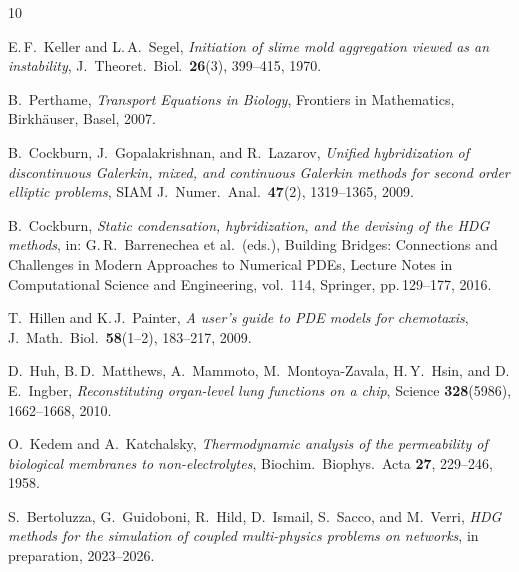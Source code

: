 \documentclass[11pt,a4paper]{article}
\begin{document}
\begingroup
\raggedright
\begin{thebibliography}{10}

E.\,F.~Keller and L.\,A.~Segel,
\emph{Initiation of slime mold aggregation viewed as an instability},
J.~Theoret.\ Biol.\ \textbf{26}(3), 399--415, 1970.

B.~Perthame,
\emph{Transport Equations in Biology},
Frontiers in Mathematics, Birkh\"auser, Basel, 2007.

B.~Cockburn, J.~Gopalakrishnan, and R.~Lazarov,
\emph{Unified hybridization of discontinuous Galerkin, mixed, and
continuous Galerkin methods for second order elliptic problems},
SIAM J.~Numer.\ Anal.\ \textbf{47}(2), 1319--1365, 2009.

B.~Cockburn,
\emph{Static condensation, hybridization, and the devising of the
HDG methods},
in: G.\,R.~Barrenechea et al.\ (eds.), Building Bridges:
Connections and Challenges in Modern Approaches to Numerical
PDEs, Lecture Notes in Computational Science and Engineering,
vol.~114, Springer, pp.\,129--177, 2016.

T.~Hillen and K.\,J.~Painter,
\emph{A user's guide to PDE models for chemotaxis},
J.~Math.\ Biol.\ \textbf{58}(1--2), 183--217, 2009.

D.~Huh, B.\,D.~Matthews, A.~Mammoto, M.~Montoya-Zavala,
H.\,Y.~Hsin, and D.\,E.~Ingber,
\emph{Reconstituting organ-level lung functions on a chip},
Science \textbf{328}(5986), 1662--1668, 2010.

O.~Kedem and A.~Katchalsky,
\emph{Thermodynamic analysis of the permeability of biological
membranes to non-electrolytes},
Biochim.\ Biophys.\ Acta \textbf{27}, 229--246, 1958.

S.~Bertoluzza, G.~Guidoboni, R.~Hild, D.~Ismail, S.~Sacco, and M.~Verri,
\emph{HDG methods for the simulation of coupled
multi-physics problems on networks},
in preparation, 2023--2026.

\end{thebibliography}
\endgroup
\end{document}
